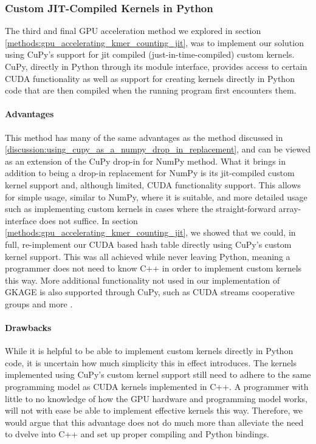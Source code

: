 \subsubsection{Custom JIT-Compiled Kernels in Python}
The third and final GPU acceleration method we explored in section \ref{methods:gpu_accelerating_kmer_counting_jit}, was to implement our solution using CuPy's support for jit compiled (just-in-time-compiled) custom kernels.
CuPy, directly in Python through its module interface, provides access to certain CUDA functionality as well as support for creating kernels directly in Python code that are then compiled when the running program first encounters them.

\paragraph{Advantages}
This method has many of the same advantages as the method discussed in \ref{discussion:using_cupy_as_a_numpy_drop_in_replacement}, and can be viewed as an extension of the CuPy drop-in for NumPy method.
What it brings in addition to being a drop-in replacement for NumPy is its jit-compiled custom kernel support and, although limited, CUDA functionality support.
This allows for simple usage, similar to NumPy, where it is suitable, and more detailed usage such as implementing custom kernels in cases where the straight-forward array-interface does not suffice.
In section \ref{methods:gpu_accelerating_kmer_counting_jit}, we showed that we could, in full, re-implement our CUDA based hash table directly using CuPy's custom kernel support.
This was all achieved while never leaving Python, meaning a programmer does not need to know C++ in order to implement custom kernels this way.
More additional functionality not used in our implementation of GKAGE is also supported through CuPy, such as CUDA streams cooperative groups and more \cite{cupy}.

\paragraph{Drawbacks}
While it is helpful to be able to implement custom kernels directly in Python code, it is uncertain how much simplicity this in effect introduces.
The kernels implemented using CuPy's custom kernel support still need to adhere to the same programming model as CUDA kernels implemented in C++.
A programmer with little to no knowledge of how the GPU hardware and programming model works, will not with ease be able to implement effective kernels this way.
Therefore, we would argue that this advantage does not do much more than alleviate the need to dvelve into C++ and set up proper compiling and Python bindings.

